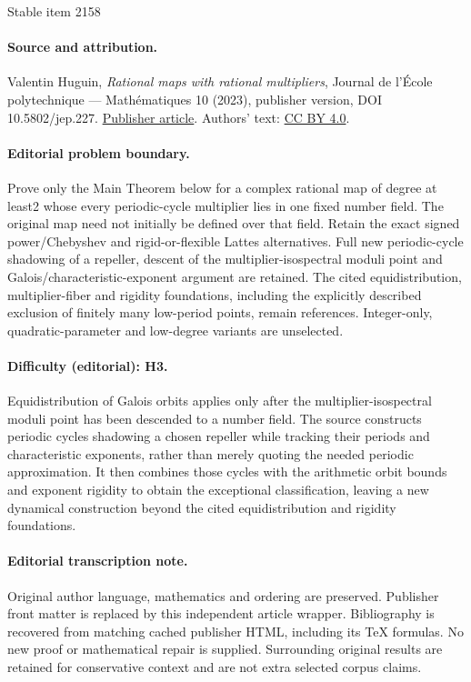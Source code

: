 \documentclass[11pt]{article}
\theoremstyle{plain}
\theoremstyle{definition}
\theoremstyle{remark}
\begin{document}
\begin{center}{\Large Stable item 2158}\end{center}
\paragraph{Source and attribution.}
Valentin Huguin, \emph{Rational maps with rational multipliers}, Journal de l’École polytechnique — Mathématiques 10 (2023), publisher version, DOI 10.5802/jep.227. \href{https://jep.centre-mersenne.org/articles/10.5802/jep.227/}{Publisher article}. Authors' text: \href{https://creativecommons.org/licenses/by/4.0/}{CC BY 4.0}.
\paragraph{Editorial problem boundary.}
Prove only the Main Theorem below for a complex rational map of degree at least2 whose every periodic-cycle multiplier lies in one fixed number field. The original map need not initially be defined over that field. Retain the exact signed power/Chebyshev and rigid-or-flexible Lattes alternatives. Full new periodic-cycle shadowing of a repeller, descent of the multiplier-isospectral moduli point and Galois/characteristic-exponent argument are retained. The cited equidistribution, multiplier-fiber and rigidity foundations, including the explicitly described exclusion of finitely many low-period points, remain references. Integer-only, quadratic-parameter and low-degree variants are unselected.
\paragraph{Difficulty (editorial): H3.}
Equidistribution of Galois orbits applies only after the multiplier-isospectral moduli point has been descended to a number field. The source constructs periodic cycles shadowing a chosen repeller while tracking their periods and characteristic exponents, rather than merely quoting the needed periodic approximation. It then combines those cycles with the arithmetic orbit bounds and exponent rigidity to obtain the exceptional classification, leaving a new dynamical construction beyond the cited equidistribution and rigidity foundations.
\paragraph{Editorial transcription note.}
Original author language, mathematics and ordering are preserved. Publisher front matter is replaced by this independent article wrapper. Bibliography is recovered from matching cached publisher HTML, including its TeX formulas. No new proof or mathematical repair is supplied. Surrounding original results are retained for conservative context and are not extra selected corpus claims.
\clearpage
\end{document}
